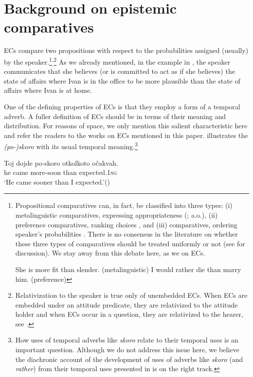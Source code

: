 \documentclass[output=paper,colorlinks,citecolor=brown,newtxmath]{langsci/langscibook}
\begin{document}
\section{Background on epistemic comparatives}\label{background}
ECs compare two propositions with respect to the probabilities assigned (usually) by the speaker.\footnote{Propositional comparatives can, in fact, be classified into three types: (i) metalinguistic comparatives, expressing appropriateness (\citealt{bre73,mcc88,emb07,mor11}; a.o.), (ii) preference comparatives, ranking choices \citep{giasta09,giayoo11}, and (iii)  comparatives, ordering speaker's probabilities \citep{finkra14,herrub14}. There is no consensus in the literature on whether these three types of comparatives should be treated uniformly or not (see \citealt{mor11} for discussion). We stay away from this debate here, as we  on ECs.

	\ea \ea She is more fit than slender. \hfill (metalinguistic)
	\ex I would rather die than marry him. \hfill (preference)
    \z \zlast
}\textsuperscript{,}\footnote{Relativization to the speaker is true only of unembedded ECs. When ECs are embedded under an attitude predicate, they are relativized to the attitude holder and when ECs occur in a question, they are relativized to the hearer, see \cite[562]{herrub14}.\label{fn:relativ}
}
As we already mentioned, in the  example in , the speaker communicates that she believes (or is committed to act as if she believes) the state of affairs where Ivan is in the office to be more plausible than the state of affairs where Ivan is at home.

One of the defining properties of ECs is that they employ a  form of a temporal adverb. A fuller definition of ECs should be in terms of their meaning and distribution. For reasons of space, we only mention this salient characteristic here and refer the readers to the works on ECs mentioned in this paper.  illustrates the  \textit{(po-)}\textit{skoro} with its usual temporal meaning.\footnote{How  uses of temporal adverbs like \textit{skoro} relate to their temporal uses is an important question. Although we do not address this issue here, we believe the diachronic account of the development of  uses of adverbs like \textit{skoro} (and \textit{rather}) from their temporal uses presented in \citet{ger16} is on the right track.
}

	\ea \gll Toj dojde	po-skoro	otkolkoto očakvah.\\
	he came	more-soon than expected.\textsc{1sg} \\
 	\glt `He came sooner than I expected.'\hfill () \label{skoro}
	\z
\end{document}
